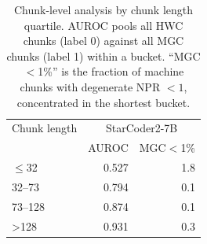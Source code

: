 \begin{table}[t]
\centering
\caption{Chunk-level analysis by chunk length quartile. AUROC pools all HWC chunks (label 0) against all MGC chunks (label 1) within a bucket. ``MGC$<$1\%'' is the fraction of machine chunks with degenerate NPR $<1$, concentrated in the shortest bucket.}
\label{tab:chunk-by-length}
\begin{tabular}{lrr}
\toprule
Chunk length & \multicolumn{2}{c}{StarCoder2-7B} \\
 & AUROC & MGC$<$1\% \\
\midrule
$\leq$32 & 0.527 & 1.8 \\
32--73 & 0.794 & 0.1 \\
73--128 & 0.874 & 0.1 \\
>128 & 0.931 & 0.3 \\
\bottomrule
\end{tabular}
\end{table}
